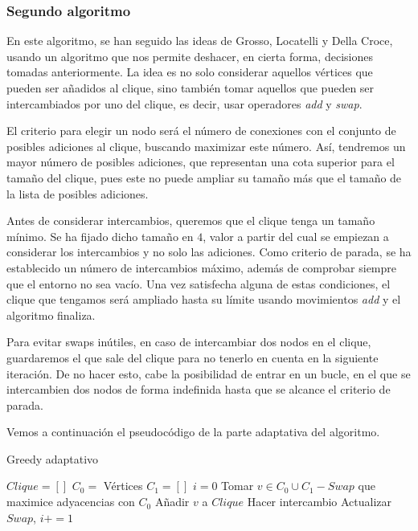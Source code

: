 \subsubsection{Segundo algoritmo}

En este algoritmo, se han seguido las ideas de Grosso, Locatelli y Della Croce, usando un algoritmo
que nos permite deshacer, en cierta forma, decisiones tomadas anteriormente. La idea es no solo
considerar aquellos vértices que pueden ser añadidos al clique, sino también tomar aquellos que
pueden ser intercambiados por uno del clique, es decir, usar operadores \textit{add} y \textit{swap}.

El criterio para elegir un nodo será el número de conexiones con el conjunto de posibles adiciones
al clique, buscando maximizar este número. Así, tendremos un mayor número de posibles adiciones, que
representan una cota superior para el tamaño del clique, pues este no puede ampliar su tamaño
más que el tamaño de la lista de posibles adiciones.

Antes de considerar intercambios, queremos que el clique tenga un tamaño mínimo. Se ha fijado
dicho tamaño en $4$, valor a partir del cual se empiezan a considerar los intercambios y no
solo las adiciones. Como criterio de parada, se ha establecido un número de intercambios máximo,
además de comprobar siempre que el entorno no sea vacío. Una vez satisfecha alguna de estas
condiciones, el clique que tengamos será ampliado hasta su límite usando movimientos \textit{add}
y el algoritmo finaliza.

Para evitar swaps inútiles, en caso de intercambiar dos nodos en el clique, guardaremos el que
sale del clique para no tenerlo en cuenta en la siguiente iteración. De no hacer esto, cabe la
posibilidad de entrar en un bucle, en el que se intercambien dos nodos de forma indefinida
hasta que se alcance el criterio de parada.

Vemos a continuación el pseudocódigo de la parte adaptativa del algoritmo.


\begin{algorithm}[H]
\caption{Greedy adaptativo}
  \begin{algorithmic}
  \State $Clique = [ ]$
  \State $C_0 = $ Vértices
  \State $C_1 = [ ]$
  \State $i = 0$
  \Repeat
    \State Tomar $v \in C_0 \cup C_1 - Swap$ que maximice adyacencias con $C_0$
      \State Añadir $v$ a $Clique$
    \Else
      \State Hacer intercambio
      \State Actualizar $Swap$, $i += 1$
    \EndIf
  \end{algorithmic}
\end{algorithm}


